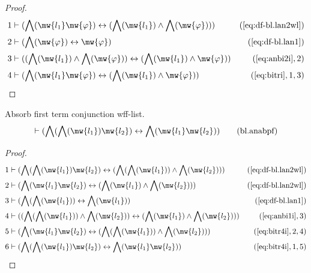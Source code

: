 \begin{proof}
\begin{align}
  1 & \vdash ( \bigwedge( \mw{l_1} \mw{\varphi} ) \leftrightarrow ( \bigwedge(
    \mw{l_1} ) \wedge \bigwedge( \mw{\varphi} ) )
    )&(\mbox{\ref{eq:df-bl.lan2wl}})\notag
  \\ 2 & \vdash ( \bigwedge( \mw{\varphi} ) \leftrightarrow \mw{\varphi}
    )&(\mbox{\ref{eq:df-bl.lan1}})\notag
  \\ 3 & \vdash ( ( \bigwedge( \mw{l_1} ) \wedge \bigwedge( \mw{\varphi} ) )
    \leftrightarrow ( \bigwedge( \mw{l_1} ) \wedge
    \mw{\varphi} ) )&(\mbox{\ref{eq:anbi2i}},2)\notag
  \\ 4 & \vdash ( \bigwedge( \mw{l_1} \mw{\varphi} ) \leftrightarrow (
    \bigwedge( \mw{l_1} ) \wedge \mw{\varphi} )
    )&(\mbox{\ref{eq:bitri}},1,3)\notag
\end{align}
\end{proof}

\begin{lemma} Absorb first term conjunction wff-list.
\begin{align}
\vdash ( \bigwedge( \bigwedge( \mw{l_1} ) \mw{l_2} ) \leftrightarrow \bigwedge(
    \mw{l_1} \mw{l_2} ) )\label{eq:bl.anabpf}\tag{bl.anabpf}
\end{align}
\end{lemma}

\begin{proof}
\begin{align}
  1 & \vdash ( \bigwedge( \bigwedge( \mw{l_1} ) \mw{l_2} ) \leftrightarrow
    ( \bigwedge( \bigwedge( \mw{l_1} ) ) \wedge
    \bigwedge( \mw{l_2} ) )
    )&(\mbox{\ref{eq:df-bl.lan2wl}})\notag
  \\ 2 & \vdash ( \bigwedge( \mw{l_1} \mw{l_2} ) \leftrightarrow (
    \bigwedge( \mw{l_1} ) \wedge \bigwedge( \mw{l_2} ) )
    )&(\mbox{\ref{eq:df-bl.lan2wl}})\notag
  \\ 3 & \vdash ( \bigwedge( \bigwedge( \mw{l_1} ) ) \leftrightarrow
    \bigwedge( \mw{l_1} )
    )&(\mbox{\ref{eq:df-bl.lan1}})\notag
  \\ 4 & \vdash ( ( \bigwedge( \bigwedge( \mw{l_1} ) ) \wedge \bigwedge(
    \mw{l_2} ) ) \leftrightarrow ( \bigwedge( \mw{l_1} )
    \wedge \bigwedge( \mw{l_2} ) )
    )&(\mbox{\ref{eq:anbi1i}},3)\notag
  \\ 5 & \vdash ( \bigwedge( \mw{l_1} \mw{l_2} ) \leftrightarrow (
    \bigwedge( \bigwedge( \mw{l_1} ) ) \wedge \bigwedge(
    \mw{l_2} ) ) )&(\mbox{\ref{eq:bitr4i}},2,4)\notag
  \\ 6 & \vdash ( \bigwedge( \bigwedge( \mw{l_1} ) \mw{l_2} )
    \leftrightarrow \bigwedge( \mw{l_1} \mw{l_2} )
    )&(\mbox{\ref{eq:bitr4i}},1,5)\notag
\end{align}
\end{proof}

